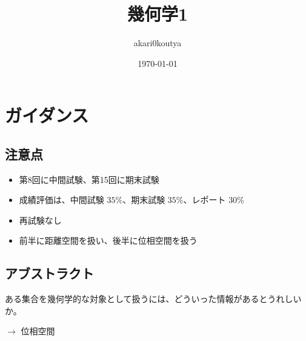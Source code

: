 \documentclass[article,paper=a4paper]{jlreq}
\title{幾何学1}
\author{akari0koutya}
\date{\today}
\begin{document}
\maketitle
\tableofcontents


\section{ガイダンス}

\subsection{注意点}

\begin{itemize}
    \item 第8回に中間試験、第15回に期末試験
    \item 成績評価は、中間試験 $35\%$、期末試験 $35\%$、レポート $30\%$
    \item 再試験なし
    \item 前半に距離空間を扱い、後半に位相空間を扱う
\end{itemize}

\subsection{アブストラクト}

ある集合を幾何学的な対象として扱うには、どういった情報があるとうれしいか。\par
$\longrightarrow$ 位相空間
\end{document}
